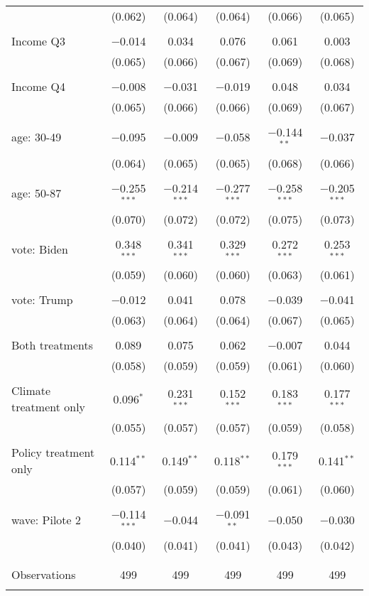 \begin{tabular}{@{\extracolsep{5pt}}lccccc}
  & (0.062) & (0.064) & (0.064) & (0.066) & (0.065) \\ 
  & & & & & \\ 
 Income Q3 & $-$0.014 & 0.034 & 0.076 & 0.061 & 0.003 \\ 
  & (0.065) & (0.066) & (0.067) & (0.069) & (0.068) \\ 
  & & & & & \\ 
 Income Q4 & $-$0.008 & $-$0.031 & $-$0.019 & 0.048 & 0.034 \\ 
  & (0.065) & (0.066) & (0.066) & (0.069) & (0.067) \\ 
  & & & & & \\ 
 age: 30-49 & $-$0.095 & $-$0.009 & $-$0.058 & $-$0.144$^{**}$ & $-$0.037 \\ 
  & (0.064) & (0.065) & (0.065) & (0.068) & (0.066) \\ 
  & & & & & \\ 
 age: 50-87 & $-$0.255$^{***}$ & $-$0.214$^{***}$ & $-$0.277$^{***}$ & $-$0.258$^{***}$ & $-$0.205$^{***}$ \\ 
  & (0.070) & (0.072) & (0.072) & (0.075) & (0.073) \\ 
  & & & & & \\ 
 vote: Biden & 0.348$^{***}$ & 0.341$^{***}$ & 0.329$^{***}$ & 0.272$^{***}$ & 0.253$^{***}$ \\ 
  & (0.059) & (0.060) & (0.060) & (0.063) & (0.061) \\ 
  & & & & & \\ 
 vote: Trump & $-$0.012 & 0.041 & 0.078 & $-$0.039 & $-$0.041 \\ 
  & (0.063) & (0.064) & (0.064) & (0.067) & (0.065) \\ 
  & & & & & \\ 
 Both treatments & 0.089 & 0.075 & 0.062 & $-$0.007 & 0.044 \\ 
  & (0.058) & (0.059) & (0.059) & (0.061) & (0.060) \\ 
  & & & & & \\ 
 Climate treatment only & 0.096$^{*}$ & 0.231$^{***}$ & 0.152$^{***}$ & 0.183$^{***}$ & 0.177$^{***}$ \\ 
  & (0.055) & (0.057) & (0.057) & (0.059) & (0.058) \\ 
  & & & & & \\ 
 Policy treatment only & 0.114$^{**}$ & 0.149$^{**}$ & 0.118$^{**}$ & 0.179$^{***}$ & 0.141$^{**}$ \\ 
  & (0.057) & (0.059) & (0.059) & (0.061) & (0.060) \\ 
  & & & & & \\ 
 wave: Pilote 2 & $-$0.114$^{***}$ & $-$0.044 & $-$0.091$^{**}$ & $-$0.050 & $-$0.030 \\ 
  & (0.040) & (0.041) & (0.041) & (0.043) & (0.042) \\ 
  & & & & & \\ 
\hline \\[-1.8ex] 

Observations & 499 & 499 & 499 & 499 & 499 \\ 
\hline 
\hline \\[-1.8ex] 
\end{tabular} 